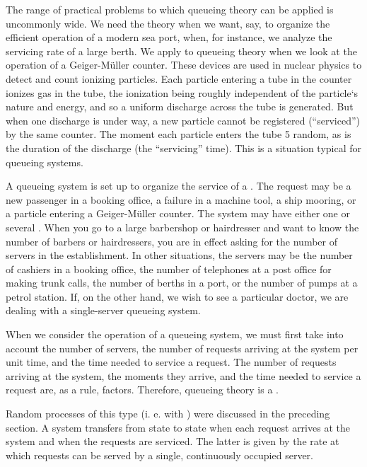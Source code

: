 The range of practical problems to which queueing theory can be
applied is uncommonly wide. We need the theory when we want, say, to
organize the efficient operation of a modern sea port, when, for instance,
we analyze the servicing rate of a large berth. We apply to queueing
theory when we look at the operation of a Geiger-M\"uller counter. These
devices are used in nuclear physics to detect and count ionizing
particles. Each particle entering a tube in the counter ionizes gas in the
tube, the ionization being roughly independent of the particle‘s nature
and energy, and so a uniform discharge across the tube is generated. But
when one discharge is under way, a new particle cannot be registered
(``serviced'') by the same counter. The moment each particle enters the
tube 5 random, as is the duration of the discharge (the ``servicing'' time).
This is a situation typical for queueing systems.

 A queueing system is set up to organize the service of
a . The request may be a new passenger in a booking
office, a failure in a machine tool, a ship mooring, or a particle entering
a Geiger-M\"uller counter. The system may have either one or several
. When you go to a large barbershop or hairdresser and want to
know the number of barbers or hairdressers, you are in effect asking for
the number of servers in the establishment. In other situations, the
servers may be the number of cashiers in a booking office, the number
of telephones at a post office for making trunk calls, the number of
berths in a port, or the number of pumps at a petrol station. If, on the
other hand, we wish to see a particular doctor, we are dealing with
a single-server queueing system.

When we consider the operation of a queueing system, we must first
take into account the number of servers, the number of requests arriving
at the system per unit time, and the time needed to service a request.
The number of requests arriving at the system, the moments they arrive,
and the time needed to service a request are, as a rule,  factors.
Therefore, queueing theory is a .

Random processes of this type (i. e. with ) were discussed
in the preceding section. A system transfers from state to state when each request arrives at the system and when the requests are serviced. The latter is given by the rate at which requests can be served by a single, continuously occupied server.

